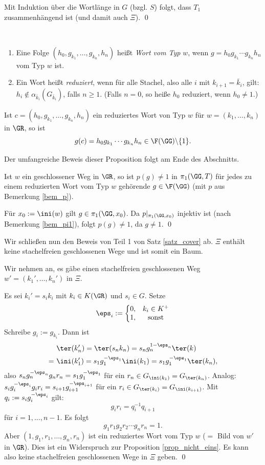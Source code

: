 Mit Induktion über die Wortlänge in $G$ (bzgl. $S$) folgt,
dass $T_1$ zusammenhängend ist (und damit auch $\Xi$).
\qed

\DEF\
\begin{enumerate}
\item Eine Folge $(h_0,g_{k_1},\ldots,g_{k_n},h_n)$ heißt
\emph{Wort vom Typ} $w$, wenn $g=h_0 g_{k_1}\cdots g_{k_n} h_n$
vom Typ $w$ ist.
\item Ein Wort heißt \emph{reduziert},
wenn für alle Stachel, also alle $i$ mit $k_{i+1}=\bar{k}_i$, gilt:
$h_i\not\in \alpha_{\bar{k}_i}(G_{\bar{k}_i})$, falls $n\geq 1$.
(Falls $n=0$, so heiße $h_0$ reduziert, wenn $h_0\neq 1$.)
\end{enumerate}

\PROP\label{prop_nicht_eins}
Ist $c=(h_0,g_{k_1},\ldots,g_{k_n},h_n)$ ein reduziertes Wort
von Typ $w$ für $w=(k_1,\ldots,k_n)$ in $\GR$, so ist
\[
g(c) = h_0 g_{k_1}\cdots g_{k_n} h_n \in \F(\GG)\backslash\{ 1 \}.
\]

Der umfangreiche Beweis dieser Proposition folgt am Ende
des Abschnitts.

\FOLG Ist $w$ ein geschlossener Weg in $\GR$, so ist $p(g)\neq 1$
in $\pi_1(\GG,T)$ für jedes zu einem reduzierten Wort vom Typ $w$
gehörende $g\in \F(\GG)$ (mit $p$ aus Bemerkung \ref{bem_p}).

\bew Für $x_0 := \ini(w)$ gilt $g\in \pi_1(\GG,x_0)$.
Da $p|_{\pi_1(\GG,x_0)}$ injektiv ist (nach Bemerkung \ref{bem_pi1}),
folgt $p(g)\neq 1$, da $g\neq 1$.
\qed

Wir schließen nun den Beweis von Teil 1 von Satz \ref{satz_cover} ab.
\BEM $\Xi$ enthält keine stachelfreien geschlossenen
Wege und ist somit ein Baum.

\bew Wir nehmen an, es gäbe einen stachelfreien geschlossenen Weg
$w'=(k_1',\ldots,k_n')$ in $\Xi$.

Es sei $k_i' = s_i k_i$ mit $k_i \in K(\GR)$ und $s_i\in G$.
Setze
\[
\eps_i := \left\{
\begin{matrix}
0, & k_i \in K^+ \\
1, & \text{sonst}
\end{matrix}\right.
\]
Schreibe $g_i := g_{k_i}$. Dann ist
\begin{align*}
& \ter(k_n') = \ter(s_n k_n) = s_n g_n^{1-\eps_n} \ter(k) \\
=\ & \ini(k_1')=s_1 g_1^{-\eps_1}\ini(k_1)=s_1 g_1^{-\eps_1}\ter(k_n),
\end{align*}
also $s_n g_n^{-\eps_n} g_n r_n = s_1 g_1^{-\eps_1}$ für ein
$r_n \in G_{\ini(k_1)}=G_{\ter(k_n)}$.
Analog: $s_i g_i^{-\eps_i} g_i r_i = s_{i+1} g_{i+1}^{-\eps_{i+1}}$
für ein $r_i\in G_{\ter(k_i)}=G_{\ini(k_{i+1})}$.
Mit $q_i := s_i g_i^{-\eps_i}$ gilt:
\[
g_i r_i = q_i^{-1} q_{i+1}
\]
für $i=1,\ldots, n-1$.
Es folgt
\[
g_1 r_1 g_2 r_2 \cdots g_n r_n = 1.
\]
Aber $(1,g_1,r_1,\ldots,g_n,r_n)$ ist ein reduziertes Wort vom Typ
$w$ ($=$ Bild von $w'$ in $\GR$).
Dies ist ein Widerspruch zur Proposition \ref{prop_nicht_eins}.
Es kann also keine stachelfreien geschlossenen Wege in $\Xi$ geben.
\qed

